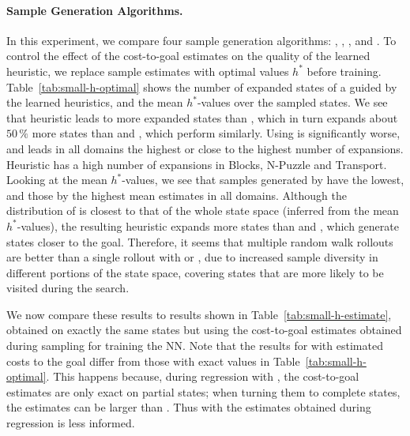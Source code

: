 \paragraph{Sample Generation Algorithms.}

In this experiment, we compare four sample generation algorithms: \bfs, \dfs, \rw, and \bfsrw. To control the effect of the cost-to-goal estimates on the quality of the learned heuristic, we replace sample estimates with optimal values $h^{*}$ before training.  Table~\ref{tab:small-h-optimal} shows the number of expanded states of a \gbfs guided by the learned heuristics, and the mean $h^{*}$-values over the sampled states. We see that heuristic \hnnbfs leads to more expanded states than \hnndfs, which in turn expands about $50\,\%$ more states than \hnnrw and \hnnbfsrw, which perform similarly. Using \hnnbfs is significantly worse, and leads in all domains the highest or close to the highest number of expansions. Heuristic \hnndfs has a high number of expansions in Blocks, N-Puzzle and Transport. Looking at the mean $h^{*}$-values, we see that samples generated by \bfs have the lowest, and those by \dfs the highest mean estimates in all domains. Although the distribution of \dfs is closest to that of the whole state space (inferred from the mean $h^{*}$-values), the resulting heuristic expands more states than \rw and \bfsrw, which generate states closer to the goal. Therefore, it seems that multiple random walk rollouts are better than a single rollout with \bfs or \dfs, due to increased sample diversity in different portions of the state space, covering states that are more likely to be visited during the search.



We now compare these results to results shown in Table~\ref{tab:small-h-estimate}, obtained on exactly the same states but using the cost-to-goal estimates obtained during sampling for training the NN. Note that the results for \bfs with estimated costs to the goal differ from those with exact values in Table~\ref{tab:small-h-optimal}. This happens because, during regression with \bfs, the cost-to-goal estimates are only exact on partial states; when turning them to complete states, the estimates can be larger than \hstar. Thus \hnnbfs with the estimates obtained during regression is less informed.

